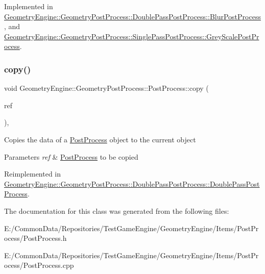 Implemented in \mbox{\hyperlink{class_geometry_engine_1_1_geometry_post_process_1_1_double_pass_post_process_1_1_blur_post_process_a4399f435326724c64cf255a40479d330}{Geometry\+Engine\+::\+Geometry\+Post\+Process\+::\+Double\+Pass\+Post\+Process\+::\+Blur\+Post\+Process}}, and \mbox{\hyperlink{class_geometry_engine_1_1_geometry_post_process_1_1_single_pass_post_process_1_1_grey_scale_post_process_a36f198711874587c9cbf5c958e6d09ea}{Geometry\+Engine\+::\+Geometry\+Post\+Process\+::\+Single\+Pass\+Post\+Process\+::\+Grey\+Scale\+Post\+Process}}.

\mbox{\label{class_geometry_engine_1_1_geometry_post_process_1_1_post_process_aba093c175b228894204e785a5a54e6e9}} 
\subsubsection{\texorpdfstring{copy()}{copy()}}
{\footnotesize\ttfamily void Geometry\+Engine\+::\+Geometry\+Post\+Process\+::\+Post\+Process\+::copy (\begin{DoxyParamCaption}\item[{const \mbox{\hyperlink{class_geometry_engine_1_1_geometry_post_process_1_1_post_process}{Post\+Process}} \&}]{ref }\end{DoxyParamCaption})\hspace{0.3cm}{\ttfamily [protected]}, {\ttfamily [virtual]}}

Copies the data of a \mbox{\hyperlink{class_geometry_engine_1_1_geometry_post_process_1_1_post_process}{Post\+Process}} object to the current object 
\begin{DoxyParams}{Parameters}
{\em ref} & \mbox{\hyperlink{class_geometry_engine_1_1_geometry_post_process_1_1_post_process}{Post\+Process}} to be copied \\
\hline
\end{DoxyParams}


Reimplemented in \mbox{\hyperlink{class_geometry_engine_1_1_geometry_post_process_1_1_double_pass_post_process_1_1_double_pass_post_process_a28b760437951a4676b55efb491358e8f}{Geometry\+Engine\+::\+Geometry\+Post\+Process\+::\+Double\+Pass\+Post\+Process\+::\+Double\+Pass\+Post\+Process}}.



The documentation for this class was generated from the following files\+:\begin{DoxyCompactItemize}
\item 
E\+:/\+Common\+Data/\+Repositories/\+Test\+Game\+Engine/\+Geometry\+Engine/\+Items/\+Post\+Process/Post\+Process.\+h\item 
E\+:/\+Common\+Data/\+Repositories/\+Test\+Game\+Engine/\+Geometry\+Engine/\+Items/\+Post\+Process/Post\+Process.\+cpp\end{DoxyCompactItemize}
